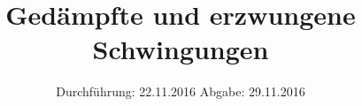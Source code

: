 

\subject{V354}
\title{Gedämpfte und erzwungene Schwingungen}
\date{
	Durchführung: 22.11.2016
	\hspace{4em}
	Abgabe: 29.11.2016
}


	\maketitle
	\newpage
	\tableofcontents
	\newpage
	
	
	
	
	
	\newpage
	
	\printbibliography

